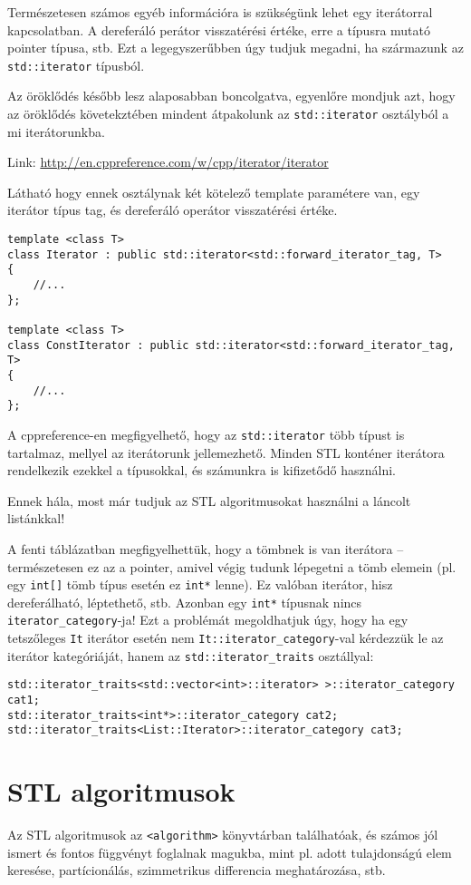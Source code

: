 \documentclass[../cpp_book/cpp_book.tex]{subfiles}
\begin{document}
	\smallskip
	Természetesen számos egyéb információra is szükségünk lehet egy iterátorral kapcsolatban. A dereferáló perátor visszatérési értéke, erre a típusra mutató pointer típusa, stb. Ezt a legegyszerűbben úgy tudjuk megadni, ha származunk az \texttt{std::iterator} típusból.
	\begin{note}
		Az öröklődés később lesz alaposabban boncolgatva, egyenlőre mondjuk azt, hogy az öröklődés követekztében mindent átpakolunk az \texttt{std::iterator} osztályból a mi iterátorunkba.
	\end{note}
	
	Link: \url{http://en.cppreference.com/w/cpp/iterator/iterator}
	\smallskip
	
	Látható hogy ennek osztálynak két kötelező template paramétere van, egy iterátor típus tag, és dereferáló operátor visszatérési értéke.
	
	\begin{lstlisting}
template <class T>
class Iterator : public std::iterator<std::forward_iterator_tag, T>
{
	//...
};

template <class T>
class ConstIterator : public std::iterator<std::forward_iterator_tag, T>
{
	//...
};
	\end{lstlisting}
	A cppreference-en megfigyelhető, hogy az \texttt{std::iterator} több típust is tartalmaz, mellyel az iterátorunk jellemezhető. Minden STL konténer iterátora rendelkezik ezekkel a típusokkal, és számunkra is kifizetődő használni.
	
	\smallskip
	Ennek hála, most már tudjuk az STL algoritmusokat használni a láncolt listánkkal!
	
	\smallskip
	A fenti táblázatban megfigyelhettük, hogy a tömbnek is van iterátora -- természetesen ez az a pointer, amivel végig tudunk lépegetni a tömb elemein (pl. egy \texttt{int[]} tömb típus esetén ez \texttt{int*} lenne). Ez valóban iterátor, hisz dereferálható, léptethető, stb. Azonban egy \texttt{int*} típusnak nincs \texttt{iterator\_category}-ja! Ezt a problémát megoldhatjuk úgy, hogy ha egy tetszőleges \texttt{It} iterátor esetén nem \texttt{It::iterator\_category}-val kérdezzük le az iterátor kategóriáját, hanem az \texttt{std::iterator\_traits} osztállyal:
	\begin{lstlisting}
std::iterator_traits<std::vector<int>::iterator> >::iterator_category cat1;
std::iterator_traits<int*>::iterator_category cat2;
std::iterator_traits<List::Iterator>::iterator_category cat3;
	\end{lstlisting}
	\section{STL algoritmusok}
	Az STL algoritmusok az \texttt{<algorithm>} könyvtárban találhatóak, és számos jól ismert és fontos függvényt foglalnak magukba, mint pl. adott tulajdonságú elem keresése, partícionálás, szimmetrikus differencia meghatározása, stb.
	
\end{document}
